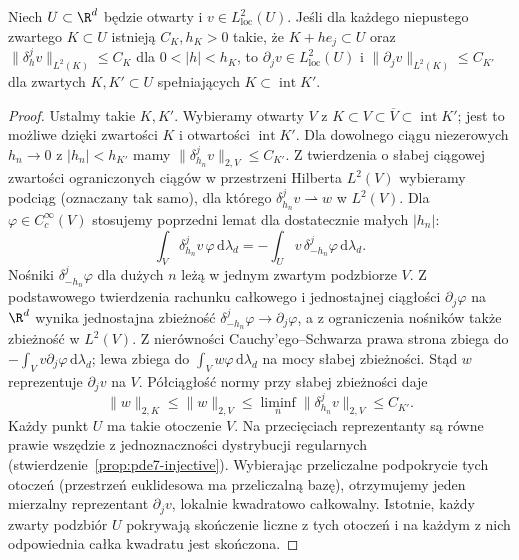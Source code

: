 \begin{lemat}
\label{lem:pde15-criterion}
Niech $U\subset\R^d$ będzie otwarty i $v\in L^2_{\mathrm{loc}}(U)$.
Jeśli dla każdego niepustego zwartego $K\subset U$ istnieją
$C_K,h_K>0$ takie, że $K+he_j\subset U$ oraz
$\|\delta_h^jv\|_{L^2(K)}\le C_K$ dla $0<|h|<h_K$, to
$\partial_jv\in L^2_{\mathrm{loc}}(U)$ i
$\|\partial_jv\|_{L^2(K)}\le C_{K'}$ dla zwartych
$K,K'\subset U$ spełniających $K\subset\operatorname{int}K'$.
\end{lemat}
\begin{proof}
Ustalmy takie $K,K'$. Wybieramy otwarty $V$ z
$K\subset V\subset\overline V\subset\operatorname{int}K'$;
jest to możliwe dzięki zwartości $K$ i otwartości
$\operatorname{int}K'$. Dla dowolnego ciągu niezerowych
$h_n\to0$ z $|h_n|<h_{K'}$ mamy
$\|\delta_{h_n}^jv\|_{2,V}\le C_{K'}$.
Z twierdzenia o słabej ciągowej zwartości ograniczonych
ciągów w przestrzeni Hilberta $L^2(V)$ wybieramy podciąg
(oznaczany tak samo), dla którego
$\delta_{h_n}^jv\rightharpoonup w$ w $L^2(V)$.
Dla $\varphi\in C_c^\infty(V)$ stosujemy poprzedni lemat
dla dostatecznie małych $|h_n|$:
\[
 \int_V\delta_{h_n}^jv\,\varphi\,\mathrm d\lambda_d
 =-\int_U v\,\delta_{-h_n}^j\varphi\,\mathrm d\lambda_d .
\]
Nośniki $\delta_{-h_n}^j\varphi$ dla dużych $n$
leżą w jednym zwartym podzbiorze $V$.
Z podstawowego twierdzenia rachunku całkowego i jednostajnej
ciągłości $\partial_j\varphi$ na $\R^d$ wynika jednostajna
zbieżność $\delta_{-h_n}^j\varphi\to\partial_j\varphi$,
a z ograniczenia nośników także zbieżność w $L^2(V)$.
Z nierówności Cauchy'ego--Schwarza prawa strona zbiega do
$-\int_V v\partial_j\varphi\,\mathrm d\lambda_d$;
lewa zbiega do $\int_V w\varphi\,\mathrm d\lambda_d$
na mocy słabej zbieżności. Stąd $w$ reprezentuje
$\partial_jv$ na $V$. Półciągłość normy przy słabej zbieżności
daje
\[
 \|w\|_{2,K}\le\|w\|_{2,V}
 \le\liminf_n\|\delta_{h_n}^jv\|_{2,V}\le C_{K'}.
\]
Każdy punkt $U$ ma takie otoczenie $V$. Na przecięciach
reprezentanty są równe prawie wszędzie z jednoznaczności
dystrybucji regularnych (stwierdzenie~\ref{prop:pde7-injective}).
Wybierając przeliczalne podpokrycie tych otoczeń (przestrzeń
euklidesowa ma przeliczalną bazę), otrzymujemy jeden
mierzalny reprezentant $\partial_jv$, lokalnie kwadratowo
całkowalny. Istotnie, każdy zwarty podzbiór $U$ pokrywają
skończenie liczne z tych otoczeń i na każdym z nich
odpowiednia całka kwadratu jest skończona.
\end{proof}

